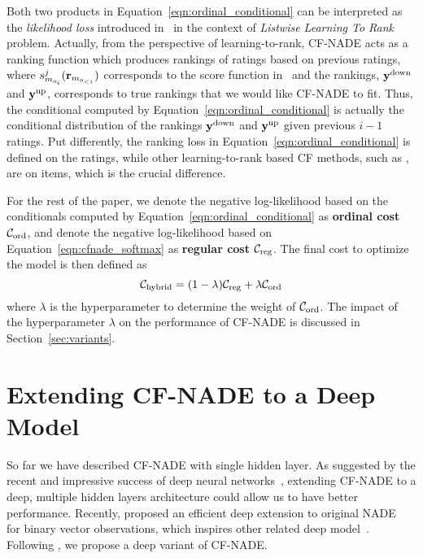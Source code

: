 \documentclass{article}
\newcommand{\cfnade}{CF-NADE\xspace}
\newcommand{\cost}{\mathcal{C}}
\begin{document}
Both two products in Equation~\ref{eqn:ordinal_conditional} can be
interpreted as the \emph{likelihood loss} introduced
in~\citep{xia2008listwise} in the context of \emph{Listwise Learning
  To Rank} problem. Actually, from the perspective of
learning-to-rank, \cfnade acts as a ranking function which produces
rankings of ratings based on previous ratings, where
$s_{m_{o_i}}^{j}({\bf r}_{m_{o_{<i}}})$ corresponds to the score
function in~\citep{xia2008listwise} and the rankings,
${\bf y}^{\textup{down}}$ and ${\bf y}^{\textup{up}}$, corresponds to
true rankings that we would like \cfnade to fit. Thus, the conditional
computed by Equation~\ref{eqn:ordinal_conditional} is actually the
conditional distribution of the rankings ${\bf y}^{\textup{down}}$ and
${\bf y}^{\textup{up}}$ given previous $i-1$ ratings. Put differently, the ranking loss in Equation~\ref{eqn:ordinal_conditional}
is defined on the ratings, while other learning-to-rank based CF methods, such as \citep{shi2010list}, are on items, which is the crucial difference.

For the rest of the paper, we denote the negative log-likelihood based
on the conditionals computed by Equation~\ref{eqn:ordinal_conditional}
as \textbf{ordinal cost} $\cost_{\textup{ord}}$, and denote the
negative log-likelihood based on Equation~\ref{eqn:cfnade_softmax} as
\textbf{regular cost} $\cost_{\textup{reg}}$. The final cost to
optimize the model is then defined as
\begin{equation}
    \cost_{\textup{hybrid}} = (1-\lambda)\cost_{\textup{reg}} + \lambda\cost_{\textup{ord}}
    \label{eqn:hybrid_cost}
\end{equation}
where $\lambda$ is the hyperparameter to determine the weight of
$\cost_{\textup{ord}}$. The impact of the hyperparameter $\lambda$ on
the performance of \cfnade is discussed in Section~\ref{sec:variants}.




 





\section{Extending \cfnade to a Deep Model}
\label{sec:deepcfnade}
So far we have described \cfnade with single hidden layer. As suggested
by the recent and impressive success of deep neural
networks~\citep{krizhevsky2012imagenet,szegedy2014going,he2015deep},
extending \cfnade to a deep, multiple hidden layers architecture could
allow us to have better performance. Recently, \citet{Uria2013b}
proposed an efficient deep extension to original
NADE~\citep{larochelle2011neural} for binary vector observations,
which inspires other related deep model~\citep{zheng15deep}. Following
\citep{Uria2013b}, we propose a deep variant of \cfnade.
\end{document}
